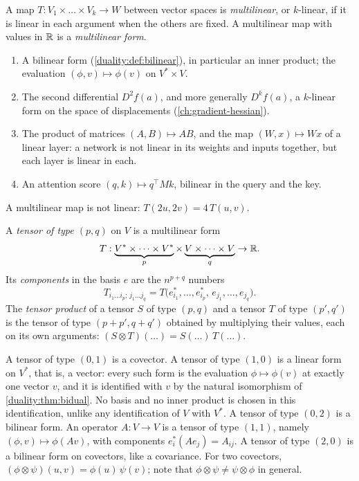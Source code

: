 \begin{notechapter}
\begin{definition}\label{multilinear-algebra:def:multilinear}
A map $T:V_1\times\dots\times V_k\to W$ between vector spaces is
\emph{multilinear}, or $k$-linear, if it is linear in each argument when
the others are fixed. A multilinear map with values in $\mathbb{R}$ is a
\emph{multilinear form}.
\end{definition}

\begin{example}\label{multilinear-algebra:ex:multilinear}
\begin{enumerate}[nosep]
  \item A bilinear form (\cref{duality:def:bilinear}), in particular an
        inner product; the evaluation $(\phi, v)\mapsto\phi(v)$ on
        $V^*\times V$.
  \item The second differential $D^2f(a)$, and more generally
        $D^kf(a)$, a $k$-linear form on the space of displacements
        (\cref{ch:gradient-hessian}).
  \item The product of matrices $(A, B)\mapsto AB$, and the map
        $(W, x)\mapsto Wx$ of a linear layer: a network is not linear
        in its weights and inputs together, but each layer is linear in
        each.
  \item An attention score $(q, k)\mapsto q^\top Mk$, bilinear in the
        query and the key.
\end{enumerate}
A multilinear map is not linear: $T(2u, 2v) = 4\,T(u, v)$.
\end{example}

\begin{definition}[Tensor]\label{multilinear-algebra:def:tensor}
A \emph{tensor of type $(p, q)$} on $V$ is a multilinear form
\[
  T:\underbrace{V^*\times\dots\times V^*}_{p}
    \times\underbrace{V\times\dots\times V}_{q}\to\mathbb{R} .
\]
Its \emph{components} in the basis $e$ are the $n^{p+q}$ numbers
\[
  T_{i_1\dots i_p;\,j_1\dots j_q}
  = T\bigl(e_{i_1}^*,\dots,e_{i_p}^*,\,e_{j_1},\dots,e_{j_q}\bigr) .
\]
The \emph{tensor product} of a tensor $S$ of type $(p, q)$ and a tensor
$T$ of type $(p', q')$ is the tensor of type $(p + p', q + q')$
obtained by multiplying their values, each on its own arguments:
$(S\otimes T)(\dots) = S(\dots)\,T(\dots)$.
\end{definition}

A tensor of type $(0, 1)$ is a covector. A tensor of type $(1, 0)$ is a
linear form on $V^*$, that is, a vector: every such form is the
evaluation $\phi\mapsto\phi(v)$ at exactly one vector $v$, and it is
identified with $v$ by the natural isomorphism of
\cref{duality:thm:bidual}. No basis and no inner product is chosen in
this identification, unlike any identification of $V$ with $V^*$. A
tensor of type $(0, 2)$ is a bilinear form. An operator $A:V\to V$ is a
tensor of type $(1, 1)$, namely $(\phi, v)\mapsto\phi(Av)$, with
components $e_i^*(Ae_j) = A_{ij}$. A tensor of type $(2, 0)$ is a
bilinear form on covectors, like a covariance. For two covectors,
$(\phi\otimes\psi)(u, v) = \phi(u)\,\psi(v)$; note that
$\phi\otimes\psi\neq\psi\otimes\phi$ in general.


\end{notechapter}
